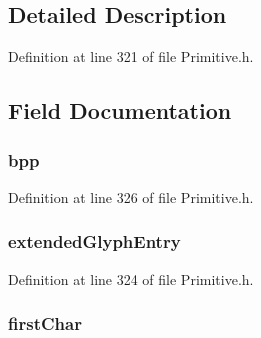 \subsection{Detailed Description}


Definition at line 321 of file Primitive.\+h.



\subsection{Field Documentation}
\hypertarget{struct_f_o_n_t___h_e_a_d_e_r_af02776c3f111a79a638c5de8c5cc4f40}{}
\subsubsection[{bpp}]{ bpp}\label{struct_f_o_n_t___h_e_a_d_e_r_af02776c3f111a79a638c5de8c5cc4f40}


Definition at line 326 of file Primitive.\+h.

\hypertarget{struct_f_o_n_t___h_e_a_d_e_r_adc7b04057cc829ed5f64dc80519ff0be}{}
\subsubsection[{extended\+Glyph\+Entry}]{ extended\+Glyph\+Entry}\label{struct_f_o_n_t___h_e_a_d_e_r_adc7b04057cc829ed5f64dc80519ff0be}


Definition at line 324 of file Primitive.\+h.

\hypertarget{struct_f_o_n_t___h_e_a_d_e_r_afaf8d9e275cbaade75cb1e8080f648be}{}
\subsubsection[{first\+Char}]{ first\+Char}\label{struct_f_o_n_t___h_e_a_d_e_r_afaf8d9e275cbaade75cb1e8080f648be}


